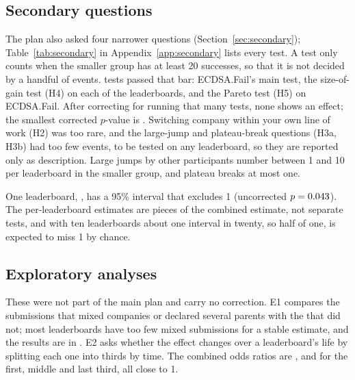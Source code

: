 \subsection{Secondary questions}
\label{sec:secondary-results}

The plan also asked four narrower questions (Section~\ref{sec:secondary}); Table~\ref{tab:secondary} in Appendix~\ref{app:secondary} lists every test.
A test only counts when the smaller group has at least 20 successes, so that it is not decided by a handful of events.
\HolmFamilySize{} tests passed that bar: ECDSA.Fail's main test, the size-of-gain test (H4) on each of the \StudyK{} leaderboards, and the Pareto test (H5) on ECDSA.Fail.
After correcting for running that many tests, none shows an effect; the smallest corrected $p$-value is \HolmMinP{}.
Switching company within your own line of work (H2) was too rare, and the large-jump and plateau-break questions (H3a, H3b) had too few events, to be tested on any leaderboard, so they are reported only as description.
Large jumps by other participants number between 1 and 10 per leaderboard in the smaller group, and plateau breaks at most one.

One leaderboard, \ExcludesOneBench{}, has a 95\% interval that excludes 1 (uncorrected $p = 0.043{}$).
The per-leaderboard estimates are pieces of the combined estimate, not separate tests, and with ten leaderboards about one interval in twenty, so half of one, is expected to miss 1 by chance.

\subsection{Exploratory analyses}
\label{sec:exploratory}

These were not part of the main plan and carry no correction.
E1 compares the \EOneMultiRows{} submissions that mixed companies or declared several parents with the \EOneSingleRows{} that did not; most leaderboards have too few mixed submissions for a stable estimate, and the results are in .
E2 asks whether the effect changes over a leaderboard's life by splitting each one into thirds by time.
The combined odds ratios are \ExploreEThirdOneOR{}, \ExploreEThirdTwoOR{} and \ExploreEThirdThreeOR{} for the first, middle and last third, all close to 1.
